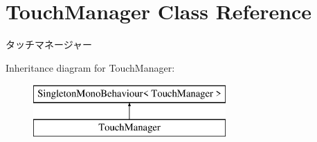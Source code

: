 \hypertarget{class_touch_manager}{}\section{Touch\+Manager Class Reference}
\label{class_touch_manager}


タッチマネージャー  


Inheritance diagram for Touch\+Manager\+:\begin{figure}[H]
\begin{center}
\leavevmode
\includegraphics[height=2.000000cm]{class_touch_manager}
\end{center}
\end{figure}
